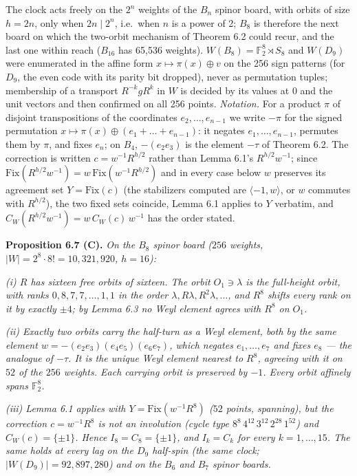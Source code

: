 \documentclass[
]{article}
\begin{document}
The clock acts freely on the \(2^n\) weights of the \(B_n\) spinor
board, with orbits of size \(h = 2n\), only when \(2n \mid 2^n\),
i.e.~when \(n\) is a power of 2; \(B_8\) is therefore the next board on
which the two-orbit mechanism of Theorem 6.2 could recur, and the last
one within reach (\(B_{16}\) has 65,536 weights).
\(W(B_8) = \mathbb{F}_2^8 \rtimes S_8\) and \(W(D_9)\) were enumerated
in the affine form \(x \mapsto \pi(x) \oplus v\) on the 256 sign
patterns (for \(D_9\), the even code with its parity bit dropped), never
as permutation tuples; membership of a transport \(R^{-k}gR^k\) in \(W\)
is decided by its values at \(0\) and the unit vectors and then
confirmed on all 256 points. \emph{Notation.} For a product \(\pi\) of
disjoint transpositions of the coordinates \(e_2, \dots, e_{n-1}\) we
write \(-\pi\) for the signed permutation
\(x \mapsto \pi(x) \oplus (e_1 + \dots + e_{n-1})\): it negates
\(e_1, \dots, e_{n-1}\), permutes them by \(\pi\), and fixes \(e_n\); on
\(B_4\), \(-(e_2e_3)\) is the element \(-\tau\) of Theorem 6.2. The
correction is written \(c = w^{-1}R^{h/2}\) rather than Lemma 6.1's
\(R^{h/2}w^{-1}\); since
\(\mathrm{Fix}(R^{h/2}w^{-1}) = w\,\mathrm{Fix}(w^{-1}R^{h/2})\) and in
every case below \(w\) preserves its agreement set
\(Y = \mathrm{Fix}(c)\) (the stabilizers computed are
\(\langle -1, w \rangle\), or \(w\) commutes with \(R^{h/2}\)), the two
fixed sets coincide, Lemma 6.1 applies to \(Y\) verbatim, and
\(C_W(R^{h/2}w^{-1}) = w\,C_W(c)\,w^{-1}\) has the order stated.

\textbf{Proposition 6.7 (C).} \emph{On the \(B_8\) spinor board (\(256\)
weights, \(|W| = 2^8 \cdot 8! = 10{,}321{,}920\), \(h = 16\)):}

\emph{(i) \(R\) has sixteen free orbits of sixteen. The orbit
\(O_1 \ni \lambda\) is the full-height orbit, with ranks
\(0, 8, 7, 7, \dots, 1, 1\) in the order
\(\lambda, R\lambda, R^2\lambda, \dots\), and \(R^8\) shifts every rank
on it by exactly \(\pm 4\); by Lemma 6.3 no Weyl element agrees with
\(R^8\) on \(O_1\).}

\emph{(ii) Exactly two orbits carry the half-turn as a Weyl element,
both by the same element \(w = -(e_2e_3)(e_4e_5)(e_6e_7)\), which
negates \(e_1, \dots, e_7\) and fixes \(e_8\) --- the analogue of
\(-\tau\). It is the unique Weyl element nearest to \(R^8\), agreeing
with it on \(52\) of the \(256\) weights. Each carrying orbit is
preserved by \(-1\). Every orbit affinely spans \(\mathbb{F}_2^8\).}

\emph{(iii) Lemma 6.1 applies with \(Y = \mathrm{Fix}(w^{-1}R^8)\)
(\(52\) points, spanning), but the correction \(c = w^{-1}R^8\) is not
an involution (cycle type \(8^8\,4^{12}\,3^{12}\,2^{28}\,1^{52}\)) and
\(C_W(c) = \{\pm 1\}\). Hence \(I_8 = C_8 = \{\pm 1\}\), and
\(I_k = C_k\) for every \(k = 1, \dots, 15\). The same holds at every
lag on the \(D_9\) half-spin (the same clock;
\(|W(D_9)| = 92{,}897{,}280\)) and on the \(B_6\) and \(B_7\) spinor
boards.}
\end{document}
